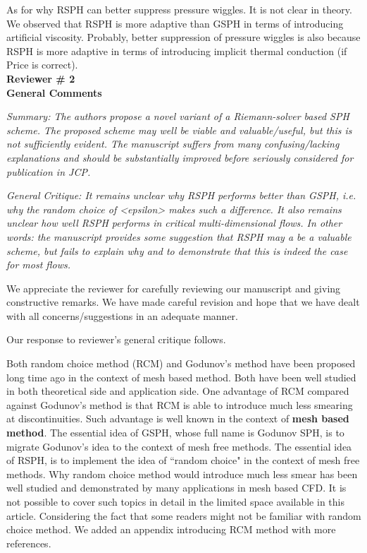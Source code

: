 \documentclass[10pt,a4paper]{article}
\begin{document}
As for why RSPH can better suppress pressure wiggles. It is not clear in theory. We observed that RSPH is more adaptive than GSPH in terms of introducing artificial viscosity. Probably, better suppression of pressure wiggles is also because RSPH is more adaptive in terms of introducing implicit thermal conduction (if Price is correct). 
\\[12pt]

\textbf{\Large Reviewer \# 2}\\[3pt]

\textbf{\large General Comments}

\textit{Summary: The authors propose a novel variant of a Riemann-solver based SPH scheme. The proposed scheme may well be viable and valuable/useful, but this is not sufficiently evident. The manuscript suffers from many confusing/lacking explanations and should be
substantially improved before seriously considered for publication in JCP.}

\textit{General Critique:
It remains unclear why RSPH performs better than GSPH, i.e. why the random choice of <epsilon> makes such a difference. It also remains unclear how well RSPH performs in critical multi-dimensional flows. In other words: the manuscript provides some suggestion that RSPH may a be a valuable scheme, but fails to explain why and to demonstrate that this is indeed the case for most flows.}

We appreciate the reviewer for carefully reviewing our manuscript and giving constructive remarks. We have made careful revision and hope that we have dealt with all concerns/suggestions in an adequate manner.

Our response to reviewer's general critique follows. 

Both random choice method (RCM) and Godunov's method have been proposed long time ago in the context of mesh based method. Both have been well studied in both theoretical side and application side. One advantage of RCM compared against Godunov's method is that RCM is able to introduce much less smearing at discontinuities. Such advantage is well known in the context of \textbf{mesh based method}.
The essential idea of GSPH, whose full name is Godunov SPH, is to migrate Godunov's idea to the context of mesh free methods. The essential idea of RSPH, is to implement the idea of ``random choice" in the context of mesh free methods. Why random choice method would introduce much less smear has been well studied and demonstrated by many applications in mesh based CFD. It is not possible to cover such topics in detail in the limited space available in this article.
Considering the fact that some readers might not be familiar with random choice method. We added an appendix introducing RCM method with more references.
\end{document}
